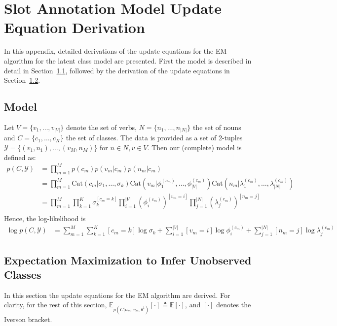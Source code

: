 \documentclass[11pt]{scrartcl}
\newcommand{\cat}{\text{Cat}}
\newcommand{\thetaold}{\theta^{t}}
\begin{document}



\onecolumn
\appendix
\section{Slot Annotation Model Update Equation Derivation}
\label{sec:part1}
In this appendix, detailed derivations of the update equations for the
EM algorithm for the latent class model are presented. First the model
is described in detail in Section~\ref{sec:model}, followed by the
derivation of the update equations in Section~\ref{sec:em}.

\subsection{Model}
\label{sec:model}
Let $V = \{v_1, \ldots, v_{|V|}\}$ denote the set of verbs, $N =
\{n_1, \ldots, n_{|N|}\}$ the set of nouns and $C = \{c_1,\ldots,
c_K\}$ the set of classes. The data is provided as a set of 2-tuples
$\mathcal{Y} = \{(v_1, n_1), \ldots, (v_M, n_M)\}$ for $n \in N, v \in V$.  Then our
(complete) model is defined as:
\begin{align}
  p(C, \mathcal{Y}) &= \prod_{m=1}^{M}p(c_m)p(v_m|c_m)p(n_m|c_m) \\
             &= \prod_{m=1}^{M}
                \cat(c_m|\sigma_1, \ldots, \sigma_k)
                \cat(v_m|\phi_1^{(c_m)}, \ldots, \phi_{|V|}^{(c_m)})
                \cat(n_m|\lambda_1^{(c_m)}, \ldots, \lambda_{|N|}^{(c_m)}) \\
             &= \prod_{m=1}^{M}
                \prod_{k=1}^K \sigma_k^{[c_m=k]} 
                \prod_{i=1}^{|V|} {(\phi_i^{(c_m)})}^{[v_m=i]}
                \prod_{j=1}^{|N|} {(\lambda_j^{(c_m)})}^{[n_m=j]} \\
 \end{align}
 Hence, the log-likelihood is
 \begin{align}
   \log p(C, \mathcal{Y})
   &=
     \sum_{m=1}^{M}
     \sum_{k=1}^K [c_m = k]\log \sigma_k +
     \sum_{i=1}^{|V|} [v_m = i]\log \phi_i^{(c_m)} +
     \sum_{j=1}^{|N|} [n_m = j]\log \lambda_j^{(c_m)}
 \end{align}


\subsection{Expectation Maximization to Infer Unobserved Classes}
\label{sec:em}
In this section the update equations for the EM algorithm are derived.
For clarity, for the rest of this section, $\mathbb{E}_{p(C | n_m, v_m,
\thetaold)}[\cdot] \triangleq \mathbb{E}[\cdot]$, and $[\cdot]$
denotes the Iverson bracket.
\end{document}
